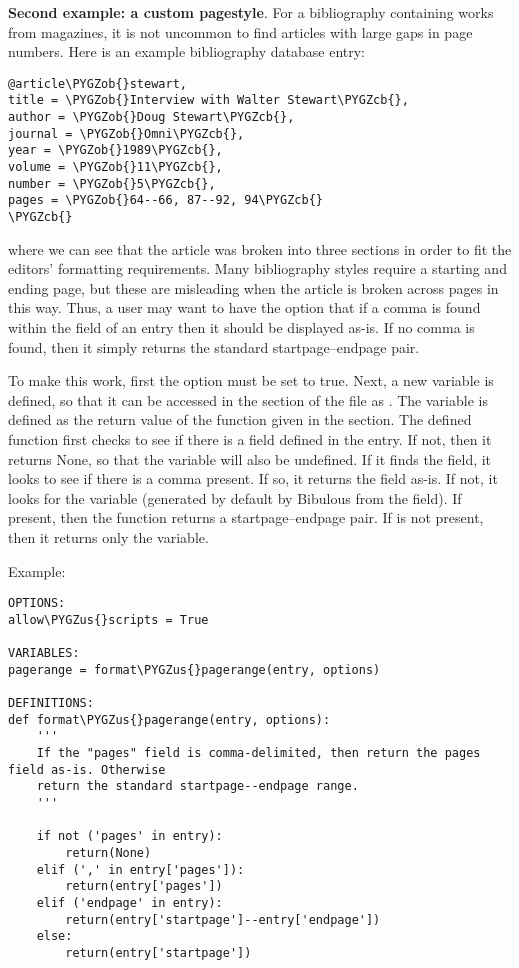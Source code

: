 \documentclass[letterpaper,10pt,english]{sphinxmanual}
\def\PYGZus{\char`\_}
\def\PYGZob{\char`\{}
\def\PYGZcb{\char`\}}
\begin{document}
\textbf{Second example: a custom pagestyle}. For a bibliography containing works from magazines, it is not uncommon to find articles with large gaps in page numbers. Here is an example bibliography database entry:

\begin{Verbatim}[commandchars=\\\{\}]
@article\PYGZob{}stewart,
title = \PYGZob{}Interview with Walter Stewart\PYGZcb{},
author = \PYGZob{}Doug Stewart\PYGZcb{},
journal = \PYGZob{}Omni\PYGZcb{},
year = \PYGZob{}1989\PYGZcb{},
volume = \PYGZob{}11\PYGZcb{},
number = \PYGZob{}5\PYGZcb{},
pages = \PYGZob{}64--66, 87--92, 94\PYGZcb{}
\PYGZcb{}
\end{Verbatim}

where we can see that the article was broken into three sections in order to fit the editors' formatting requirements. Many bibliography styles require a starting and ending page, but these are misleading when the article is broken across pages in this way. Thus, a user may want to have the option that if a comma is found within the  field of an entry then it should be displayed as-is. If no comma is found, then it simply returns the standard startpage--endpage pair.

To make this work, first the option  must be set to true. Next, a new  variable is defined, so that it can be accessed in the  section of the file as . The variable is defined as the return value of the function  given in the  section. The defined function first checks to see if there is a  field defined in the entry. If not, then it returns None, so that the  variable will also be undefined. If it finds the  field, it looks to see if there is a comma present. If so, it returns the field as-is. If not, it looks for the  variable (generated by default by Bibulous from the  field). If present, then the function returns a startpage--endpage pair. If  is not present, then it returns only the  variable.

Example:

\begin{Verbatim}[commandchars=\\\{\}]
OPTIONS:
allow\PYGZus{}scripts = True

VARIABLES:
pagerange = format\PYGZus{}pagerange(entry, options)

DEFINITIONS:
def format\PYGZus{}pagerange(entry, options):
    '''
    If the "pages" field is comma-delimited, then return the pages field as-is. Otherwise
    return the standard startpage--endpage range.
    '''

    if not ('pages' in entry):
        return(None)
    elif (',' in entry['pages']):
        return(entry['pages'])
    elif ('endpage' in entry):
        return(entry['startpage']--entry['endpage'])
    else:
        return(entry['startpage'])
\end{Verbatim}
\end{document}
